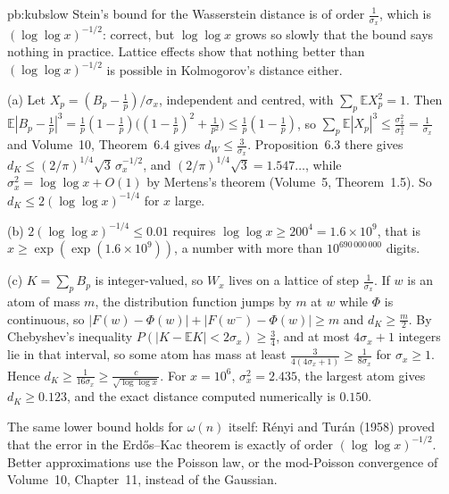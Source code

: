 \begin{solution}{pb:kubslow}
\idea Stein's bound for the Wasserstein distance is of order $\frac1{\sigma_x}$, which is $(\log\log x)^{-1/2}$: correct, but $\log\log x$ grows so slowly that the
bound says nothing in practice. Lattice effects show that nothing better than $(\log\log x)^{-1/2}$ is possible in Kolmogorov's distance either.

\writeup (a) Let $X_p=(B_p-\frac1p)/\sigma_x$, independent and centred, with $\sum_p\mathbb EX_p^2=1$. Then
$\mathbb E|B_p-\frac1p|^3=\frac1p(1-\frac1p)\bigl((1-\frac1p)^2+\frac1{p^2}\bigr)\le\frac1p(1-\frac1p)$, so $\sum_p\mathbb E|X_p|^3\le\frac{\sigma_x^2}{\sigma_x^3}=\frac1{\sigma_x}$ and
Volume~10, Theorem~6.4 gives $d_W\le\frac3{\sigma_x}$. Proposition~6.3 there gives $d_K\le(2/\pi)^{1/4}\sqrt3\,\sigma_x^{-1/2}$, and $(2/\pi)^{1/4}\sqrt3=1.547\ldots$, while
$\sigma_x^2=\log\log x+O(1)$ by Mertens's theorem (Volume~5, Theorem~1.5). So $d_K\le2(\log\log x)^{-1/4}$ for $x$ large.

(b) $2(\log\log x)^{-1/4}\le0.01$ requires $\log\log x\ge200^4=1.6\times10^9$, that is $x\ge\exp(\exp(1.6\times10^9))$, a number with more than $10^{690\,000\,000}$ digits.

(c) $K=\sum_pB_p$ is integer-valued, so $W_x$ lives on a lattice of step $\frac1{\sigma_x}$. If $w$ is an atom of mass $m$, the distribution function jumps by $m$ at $w$
while $\Phi$ is continuous, so $|F(w)-\Phi(w)|+|F(w^-)-\Phi(w)|\ge m$ and $d_K\ge\frac m2$. By Chebyshev's inequality $P(|K-\mathbb EK|<2\sigma_x)\ge\frac34$, and at most
$4\sigma_x+1$ integers lie in that interval, so some atom has mass at least $\frac3{4(4\sigma_x+1)}\ge\frac1{8\sigma_x}$ for $\sigma_x\ge1$. Hence $d_K\ge\frac1{16\sigma_x}\ge\frac c{\sqrt{\log\log x}}$.
For $x=10^6$, $\sigma_x^2=2.435$, the largest atom gives $d_K\ge0.123$, and the exact distance computed numerically is $0.150$.

\leads The same lower bound holds for $\omega(n)$ itself: Rényi and Turán (1958) proved that the error in the Erdős--Kac theorem is exactly of order
$(\log\log x)^{-1/2}$. Better approximations use the Poisson law, or the mod-Poisson convergence of Volume~10, Chapter~11, instead of the Gaussian.
\end{solution}

